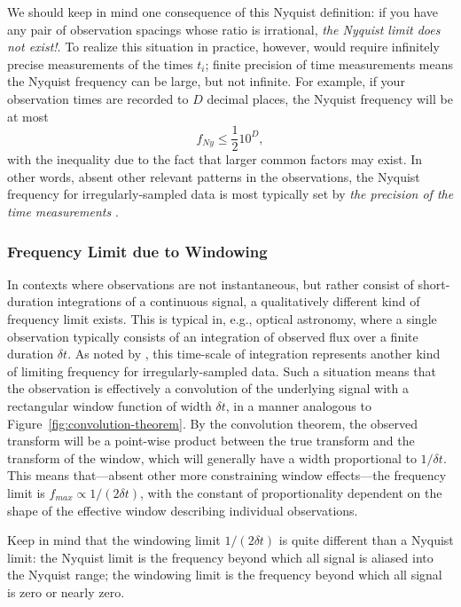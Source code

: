 \documentclass[preprint]{aastex}
\newcommand{\fig}[1]{Figure~\ref{fig:#1}}
\newcommand{\eqlabel}[1]{\label{eq:#1}}
\begin{document}
We should keep in mind one consequence of this Nyquist definition:
if you have any pair of observation spacings
whose ratio is irrational, {\it the Nyquist limit does not exist!}.
To realize this situation in practice, however, 
would require infinitely precise measurements of the
times $t_i$; finite precision of time measurements means the Nyquist
frequency can be large, but not infinite.
For example, if your observation times are recorded to $D$ decimal places,
the Nyquist frequency will be at most
\begin{equation}
  f_{Ny} \le \frac{1}{2} 10^D,
  \eqlabel{nonuniform-nyquist}
\end{equation}
with the inequality due to the fact that larger common factors may exist.
In other words, absent other relevant patterns in the observations,
the Nyquist frequency for irregularly-sampled data is most
typically set by {\it the precision of the time measurements}
\citep[see][for a more rigorous treatment of this result]{Koen2006}.

\subsubsection{Frequency Limit due to Windowing}

In contexts where observations are not instantaneous, but rather consist of
short-duration integrations of a continuous signal, a qualitatively different
kind of frequency limit exists.
This is typical in, e.g., optical astronomy, where a single observation typically consists of an integration of observed flux over a finite duration $\delta t$.
As noted by \citet{ICVG2014}, this time-scale of integration represents another
kind of limiting frequency for irregularly-sampled data.
Such a situation means that the observation is effectively a convolution of
the underlying signal with a rectangular window function of width $\delta t$,
in a manner analogous to \fig{convolution-theorem}.
By the convolution theorem, the observed transform will be a point-wise
product between the true transform and the transform of the window, which
will generally have a width proportional to $1/\delta t$.
This means that---absent other more constraining window effects---the
frequency limit is $f_{max} \propto 1/(2\delta t)$, with the constant of
proportionality dependent on the shape of the effective window describing
individual observations.

Keep in mind that the windowing limit $1/(2\delta t)$ is quite different than a
Nyquist limit: the Nyquist limit is the frequency beyond which all signal
is aliased into the Nyquist range; the windowing limit is the frequency
beyond which all signal is zero or nearly zero.
\end{document}
